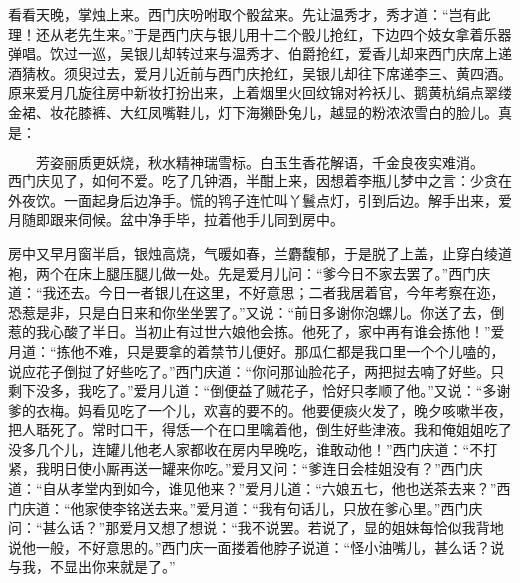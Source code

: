 看看天晚，掌烛上来。西门庆吩咐取个骰盆来。先让温秀才，秀才道：“岂有此理！还从老先生来。”于是西门庆与银儿用十二个骰儿抢红，下边四个妓女拿着乐器弹唱。饮过一巡，吴银儿却转过来与温秀才、伯爵抢红，爱香儿却来西门庆席上递酒猜枚。须臾过去，爱月儿近前与西门庆抢红，吴银儿却往下席递李三、黄四酒。原来爱月几旋往房中新妆打扮出来，上着烟里火回纹锦对衿袄儿、鹅黄杭绢点翠缕金裙、妆花膝裤、大红凤嘴鞋儿，灯下海獭卧兔儿，越显的粉浓浓雪白的脸儿。真是：

\[
芳姿丽质更妖烧，秋水精神瑞雪标。
白玉生香花解语，千金良夜实难消。
\]
西门庆见了，如何不爱。吃了几钟酒，半酣上来，因想着李瓶儿梦中之言：少贪在外夜饮。一面起身后边净手。慌的鸨子连忙叫丫鬟点灯，引到后边。解手出来，爱月随即跟来伺候。盆中净手毕，拉着他手儿同到房中。

房中又早月窗半启，银烛高烧，气暖如春，兰麝馥郁，于是脱了上盖，止穿白绫道袍，两个在床上腿压腿儿做一处。先是爱月儿问：“爹今日不家去罢了。”西门庆道：“我还去。今日一者银儿在这里，不好意思；二者我居着官，今年考察在迩，恐惹是非，只是白日来和你坐坐罢了。”又说：“前日多谢你泡螺儿。你送了去，倒惹的我心酸了半日。当初止有过世六娘他会拣。他死了，家中再有谁会拣他！”爱月道：“拣他不难，只是要拿的着禁节儿便好。那瓜仁都是我口里一个个儿嗑的，说应花子倒挝了好些吃了。”西门庆道：“你问那讪脸花子，两把挝去喃了好些。只剩下没多，我吃了。”爱月儿道：“倒便益了贼花子，恰好只孝顺了他。”又说：“多谢爹的衣梅。妈看见吃了一个儿，欢喜的要不的。他要便痰火发了，晚夕咳嗽半夜，把人聒死了。常时口干，得恁一个在口里噙着他，倒生好些津液。我和俺姐姐吃了没多几个儿，连罐儿他老人家都收在房内早晚吃，谁敢动他！”西门庆道：“不打紧，我明日使小厮再送一罐来你吃。”爱月又问：“爹连日会桂姐没有？”西门庆道：“自从孝堂内到如今，谁见他来？”爱月儿道：“六娘五七，他也送茶去来？”西门庆道：“他家使李铭送去来。”爱月道：“我有句话儿，只放在爹心里。”西门庆问：“甚么话？”那爱月又想了想说：“我不说罢。若说了，显的姐妹每恰似我背地说他一般，不好意思的。”西门庆一面搂着他脖子说道：“怪小油嘴儿，甚么话？说与我，不显出你来就是了。”

